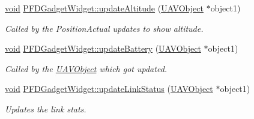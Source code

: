 \begin{DoxyCompactItemize}
\hyperlink{group___u_a_v_objects_plugin_ga444cf2ff3f0ecbe028adce838d373f5c}{void} \hyperlink{group___o_p_map_plugin_ga2502b994bd991dec300fec210a41d06c}{\-P\-F\-D\-Gadget\-Widget\-::update\-Altitude} (\hyperlink{class_u_a_v_object}{\-U\-A\-V\-Object} $\ast$object1)
\begin{DoxyCompactList}\small\item\em \-Called by the \-Position\-Actual updates to show altitude. \end{DoxyCompactList}\item 
\hyperlink{group___u_a_v_objects_plugin_ga444cf2ff3f0ecbe028adce838d373f5c}{void} \hyperlink{group___o_p_map_plugin_ga098f60a9fd8da31477dcba4496d0f322}{\-P\-F\-D\-Gadget\-Widget\-::update\-Battery} (\hyperlink{class_u_a_v_object}{\-U\-A\-V\-Object} $\ast$object1)
\begin{DoxyCompactList}\small\item\em \-Called by the \hyperlink{class_u_a_v_object}{\-U\-A\-V\-Object} which got updated. \end{DoxyCompactList}\item 
\hyperlink{group___u_a_v_objects_plugin_ga444cf2ff3f0ecbe028adce838d373f5c}{void} \hyperlink{group___o_p_map_plugin_ga2ac4d982767aaefdeb40a4b506c57497}{\-P\-F\-D\-Gadget\-Widget\-::update\-Link\-Status} (\hyperlink{class_u_a_v_object}{\-U\-A\-V\-Object} $\ast$object1)
\begin{DoxyCompactList}\small\item\em \-Updates the link stats. \end{DoxyCompactList}\end{DoxyCompactItemize}
